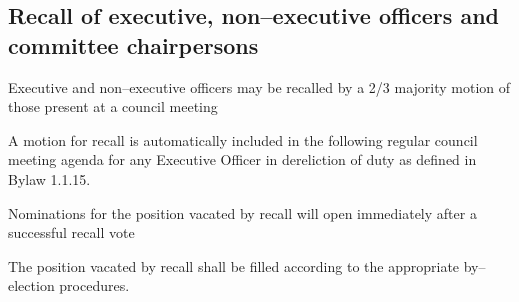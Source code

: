 \subsection {Recall of executive, non--executive officers and committee chairpersons}
\begin{longenum}[ label*=\thesubsection.\arabic*., align=left]
	\item Executive and non--executive officers may be recalled by a 2/3 majority motion of those present at a council meeting
    \item A motion for recall is automatically included in the following regular council meeting agenda for any Executive Officer in dereliction of duty as defined in Bylaw 1.1.15.
    \item Nominations for the position vacated by recall will open immediately after a successful recall vote
    \item The position vacated by recall shall be filled according to the appropriate by--election procedures.
\end{longenum}

